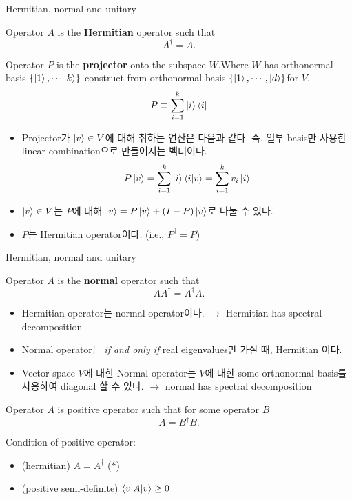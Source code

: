 \documentclass[9pt]{beamer}
\begin{document}
    \begin{frame}{Hermitian, normal and unitary}
        \begin{definition}[hermitian]
            Operator $A$ is the \textbf{Hermitian} operator such that
            $$A^\dagger = A.$$
        \end{definition}
        \begin{corollary}[projector]
            Operator $P$ is the \textbf{projector} onto the subspace $W$.Where $W$ has  orthonormal basis $\{\ket 1, \cdots \ket k\}$ construct from orthonormal basis $\{ \ket 1, \cdots, \ket d \}$for $V$.
            $$P \equiv \sum^k_{i=1} \ket i \bra i $$
        \end{corollary}
        \begin{itemize}
            \item Projector가 $\ket v \in V$에 대해 취하는 연산은 다음과 같다. 즉, 일부 basis만 사용한 linear combination으로 만들어지는 벡터이다. %
            $$P\ket v = \sum^k_{i=1} \ket i \braket {i|v} = \sum^k_{i=1} v_i \ket i$$
            \item $\ket v \in V$는 $P$에 대해 $\ket v = P\ket v + (I-P) \ket v$로 나눌 수 있다.
            \item $P$는 Hermitian operator이다. (i.e., $P^\dagger = P$)
        \end{itemize}
    \end{frame}
    
    \begin{frame}{Hermitian, normal and unitary}
        \begin{definition}[normal]
            Operator $A$ is the \textbf{normal} operator such that
            $$AA^\dagger = A^\dagger A.$$
        \end{definition}
        \begin{itemize}
            \item Hermitian operator는 normal operator이다.  $\rightarrow$ Hermitian has spectral decomposition
            \item Normal operator는 \textit{if and only if} real eigenvalues만 가질 때, Hermitian 이다.
            \item Vector space $V$에 대한 Normal operator는 $V$에 대한 some orthonormal basis를 사용하여 \alert{diagonal} 할 수 있다.  $\rightarrow$ normal has spectral decomposition
        \end{itemize}
        \vspace{0.3cm}
        \begin{definition}
            Operator $A$ is positive operator such that for some operator $B$
            $$A = B^\dagger B.$$
        \end{definition}
        Condition of positive operator:
        \begin{itemize}
            \item (hermitian) $A=A^\dagger$ ($\ast$)
            \item (positive semi-definite) $\braket{v|A|v} \ge 0$
        \end{itemize}
    \end{frame}
\end{document}
